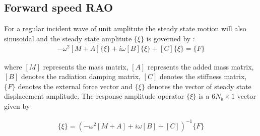 \subsection{Forward speed RAO}
For a regular incident wave of unit amplitute the steady state motion will also sinusoidal and the steady 
state amplitute $\{\xi\}$ is governed by :
\begin{align}
    -\omega^2[M + A]\{\xi\} + i\omega[B]\{\xi\} + [C]\{\xi\} = \{F\}
\end{align}

where $[M]$ represents the mass matrix, $[A]$ represents the added mass matrix, $[B]$ denotes the radiation damping matrix, $[C]$ denotes the stiffness matrix, $\{F\}$ denotes the external force vector and $\{\xi\}$ denotes the vector of steady state displacement amplitude. The response amplitude operator $\{\xi\}$ is a $6N_b \times 1$ vector given by

\begin{align}
    \{\xi\} = \left(-\omega^2[M + A] + i\omega[B] + [C]\right)^{-1} \{F\}
\end{align}
